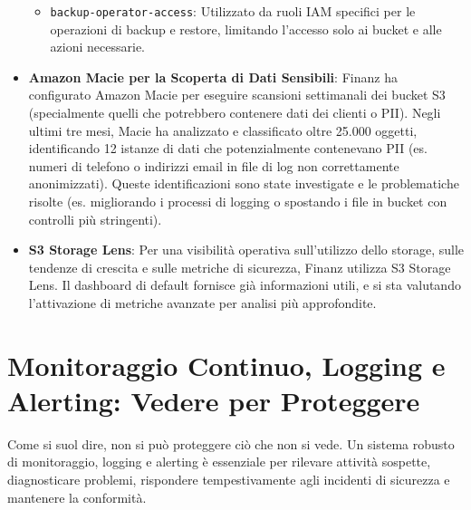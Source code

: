 \begin{itemize}
\begin{itemize}
            \item \texttt{backup-operator-access}: Utilizzato da ruoli IAM specifici per le operazioni di backup e restore, limitando l'accesso solo ai bucket e alle azioni necessarie.
        \end{itemize}
    \item \textbf{Amazon Macie per la Scoperta di Dati Sensibili}: Finanz ha configurato Amazon Macie per eseguire scansioni settimanali dei bucket S3 (specialmente quelli che potrebbero contenere dati dei clienti o PII). Negli ultimi tre mesi, Macie ha analizzato e classificato oltre 25.000 oggetti, identificando 12 istanze di dati che potenzialmente contenevano PII (es. numeri di telefono o indirizzi email in file di log non correttamente anonimizzati). Queste identificazioni sono state investigate e le problematiche risolte (es. migliorando i processi di logging o spostando i file in bucket con controlli più stringenti).
    \item \textbf{S3 Storage Lens}: Per una visibilità operativa sull'utilizzo dello storage, sulle tendenze di crescita e sulle metriche di sicurezza, Finanz utilizza S3 Storage Lens. Il dashboard di default fornisce già informazioni utili, e si sta valutando l'attivazione di metriche avanzate per analisi più approfondite.
\end{itemize}

\section{Monitoraggio Continuo, Logging e Alerting: Vedere per Proteggere}
\label{sec:monitoring-logging_cap2}
Come si suol dire, non si può proteggere ciò che non si vede. Un sistema robusto di monitoraggio, logging e alerting è essenziale per rilevare attività sospette, diagnosticare problemi, rispondere tempestivamente agli incidenti di sicurezza e mantenere la conformità.

